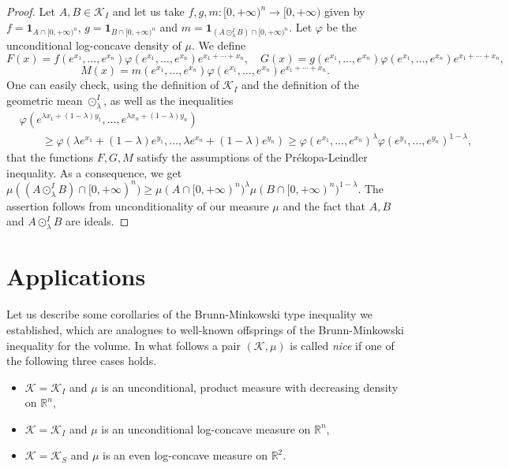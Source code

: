\documentclass[11pt]{article}
\newcommand{\mb}[1]{\mathbb{{#1}}}
\newcommand{\mc}[1]{\mathcal{{#1}}}
\newcommand{\1}{\mathbf{{1}}}
\newcommand{\vp}{\varphi}
\theoremstyle{definition}
\begin{document}
\begin{proof}
Let $A,B \in \mc{K}_I$ and let us take $f,g,m:[0,+\infty)^n \to [0,+\infty)$ given by $f=\1_{A \cap [0,+\infty)^n}$, $g=\1_{B \cap [0,+\infty)^n}$ and $m=\1_{(A \odot_\lambda^I B) \cap [0,+\infty)^n}$. Let $\vp$ be the unconditional log-concave density of $\mu$. We define
\[
	F(x)=f(e^{x_1},\ldots, e^{x_n}) \vp(e^{x_1},\ldots, e^{x_n}) e^{x_1+\cdots+x_n}, \quad G(x)=g(e^{x_1},\ldots, e^{x_n})\vp(e^{x_1},\ldots, e^{x_n}) e^{x_1+\cdots+x_n},
\]
\[
M(x)=m(e^{x_1},\ldots, e^{x_n})\vp(e^{x_1},\ldots, e^{x_n}) e^{x_1+\cdots+x_n} .
\]
One can easily check, using the definition of $\mc{K}_I$ and the definition of the geometric mean $\odot_\lambda^I$, as well as the inequalities
\begin{align*}
	& \vp(e^{\lambda x_1 + (1-\lambda)y_1},\ldots, e^{\lambda x_n + (1-\lambda)y_n}) \\
	& \qquad \geq \vp(\lambda e^{x_1} + (1-\lambda)e^{y_1},\ldots, \lambda e^{x_n} + (1-\lambda)e^{y_n}) \geq \vp(e^{x_1},\ldots,e^{x_n})^\lambda \vp(e^{y_1},\ldots,e^{y_n})^{1-\lambda},
\end{align*}
that the functions $F,G,M$ satisfy the assumptions of the Pr\'ekopa-Leindler inequality. As a consequence, we get $\mu((A \odot_\lambda^I B) \cap [0,+\infty)^n) \geq \mu(A \cap [0,+\infty)^n)^\lambda \mu( B \cap [0,+\infty)^n)^{1-\lambda}$. The assertion follows from unconditionality of our measure $\mu$ and the fact that $A,B$ and $A \odot_\lambda^I B$ are ideals.
\end{proof}




\section{Applications} \label{apl}

Let us describe some corollaries of the Brunn-Minkowski type inequality we established, which are analogues to well-known offsprings of the Brunn-Minkowski inequality for the volume. In what follows a pair $(\mc{K},\mu)$ is called \emph{nice} if one of the following three cases holds.
\begin{itemize}
\item[(a)] $\mc{K}=\mc{K}_I$ and $\mu$ is an unconditional, product measure with decreasing density on $\mb{R}^n$,
\item[(b)] $\mc{K}=\mc{K}_I$ and $\mu$ is an unconditional log-concave measure on $\mb{R}^n$,
\item[(c)] $\mc{K}=\mc{K}_S$ and $\mu$ is an even log-concave measure on $\mb{R}^2$.
\end{itemize}
\end{document}
